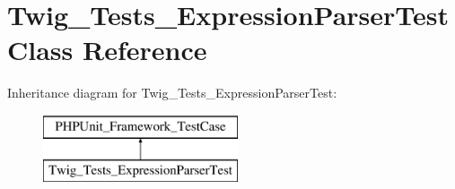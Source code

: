 \hypertarget{classTwig__Tests__ExpressionParserTest}{}\section{Twig\+\_\+\+Tests\+\_\+\+Expression\+Parser\+Test Class Reference}
\label{classTwig__Tests__ExpressionParserTest}
Inheritance diagram for Twig\+\_\+\+Tests\+\_\+\+Expression\+Parser\+Test\+:\begin{figure}[H]
\begin{center}
\leavevmode
\includegraphics[height=2.000000cm]{classTwig__Tests__ExpressionParserTest}
\end{center}
\end{figure}
